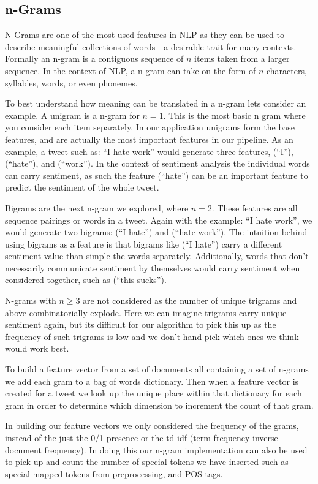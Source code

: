 \subsection{n-Grams} %
\label{sub:n_grams}

N-Grams are one of the most used features in NLP as they can be used to describe meaningful collections of words - a desirable trait for many contexts. Formally an n-gram is a contiguous sequence of $n$ items taken from a larger sequence. In the context of NLP, a n-gram can take on the form of $n$ characters, syllables, words, or even phonemes.

	To best understand how meaning can be translated in a n-gram lets consider an example. A unigram is a n-gram for $n = 1$. This is the most basic n gram where you consider each item separately. In our application unigrams form the base features, and are actually the most important features in our pipeline. As an example, a tweet such as: “I hate work” would generate three features, (“I”), (“hate”), and (“work”). In the context of sentiment analysis the individual words can carry sentiment, as such the feature (“hate”) can be an important feature to predict the sentiment of the whole tweet. 

	Bigrams are the next n-gram we explored, where $n = 2$. These features are all sequence pairings or words in a tweet. Again with the example: “I hate work”, we would generate two bigrams: (“I hate”) and (“hate work”). The intuition behind using bigrams as a feature is that bigrams like (“I hate”) carry a different sentiment value than simple the words separately. Additionally, words that don’t necessarily communicate sentiment by themselves would carry sentiment when considered together, such as (“this sucks”).

	N-grams with $n \geq 3$ are not considered as the number of unique trigrams and above combinatorially explode. Here we can imagine trigrams carry unique sentiment again, but its difficult for our algorithm to pick this up as the frequency of such trigrams is low and we don’t hand pick which ones we think would work best.

	To build a feature vector from a set of documents all containing a set of n-grams we add each gram to a bag of words dictionary. Then when a feature vector is created for a tweet we look up the unique place within that dictionary for each gram in order to determine which dimension to increment the count of that gram. 

	In building our feature vectors we only considered the frequency of the grams, instead of the just the 0/1 presence or the td-idf (term frequency-inverse document frequency). In doing this our n-gram implementation can also be used to pick up and count the number of special tokens we have inserted such as special mapped tokens from preprocessing, and POS tags.


